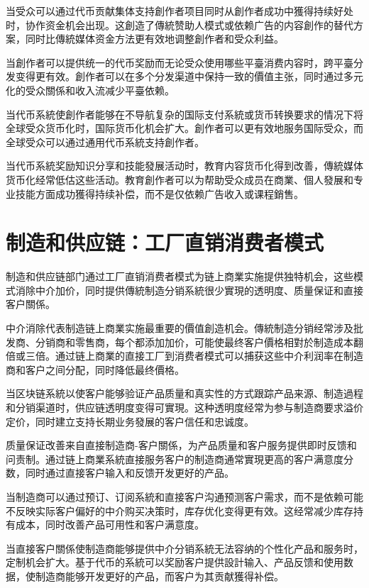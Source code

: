 \documentclass[
  Letterpaper,
]{scrbook}
\begin{document}
当受众可以通过代币贡献集体支持創作者项目同时从創作者成功中獲得持续好处时，协作资金机会出现。这創造了傳統赞助人模式或依赖广告的内容創作的替代方案，同时比傳統媒体资金方法更有效地调整創作者和受众利益。

当創作者可以提供统一的代币奖励而无论受众使用哪些平臺消费内容时，跨平臺分发变得更有效。創作者可以在多个分发渠道中保持一致的價值主张，同时通过多元化的受众關係和收入流减少平臺依赖。

当代币系統使創作者能够在不导航复杂的国际支付系統或货币转换要求的情况下将全球受众货币化时，国际货币化机会扩大。創作者可以更有效地服务国际受众，而全球受众可以通过通用代币系統支持創作者。

当代币系統奖励知识分享和技能發展活动时，教育内容货币化得到改善，傳統媒体货币化经常低估这些活动。教育創作者可以为帮助受众成员在商業、個人發展和专业技能方面成功獲得持续补偿，而不是仅依赖广告收入或课程銷售。

\section{制造和供应链：工厂直销消费者模式}\label{ux5236ux9020ux548cux4f9bux5e94ux94feux5de5ux5382ux76f4ux9500ux6d88ux8d39ux8005ux6a21ux5f0f}

制造和供应链部门通过工厂直销消费者模式为链上商業实施提供独特机会，这些模式消除中介加价，同时提供傳統制造分销系統很少實現的透明度、质量保证和直接客户關係。

中介消除代表制造链上商業实施最重要的價值創造机会。傳統制造分销经常涉及批发商、分销商和零售商，每个都添加加价，可能使最终客户價格相對於制造成本翻倍或三倍。通过链上商業的直接工厂到消费者模式可以捕获这些中介利润率在制造商和客户之间分配，同时降低最终價格。

当区块链系統以使客户能够验证产品质量和真实性的方式跟踪产品来源、制造過程和分销渠道时，供应链透明度变得可實現。这种透明度经常为参与制造商要求溢价定价，同时建立支持长期业务發展的客户信任和忠诚度。

质量保证改善来自直接制造商-客户關係，为产品质量和客户服务提供即时反馈和问责制。通过链上商業系統直接服务客户的制造商通常實現更高的客户满意度分数，同时通过直接客户输入和反馈开发更好的产品。

当制造商可以通过预订、订阅系統和直接客户沟通预测客户需求，而不是依赖可能不反映实际客户偏好的中介购买决策时，库存优化变得更有效。这经常减少库存持有成本，同时改善产品可用性和客户满意度。

当直接客户關係使制造商能够提供中介分销系統无法容纳的个性化产品和服务时，定制机会扩大。基于代币的系統可以奖励客户提供設計输入、产品反馈和使用数据，使制造商能够开发更好的产品，而客户为其贡献獲得补偿。
\end{document}
